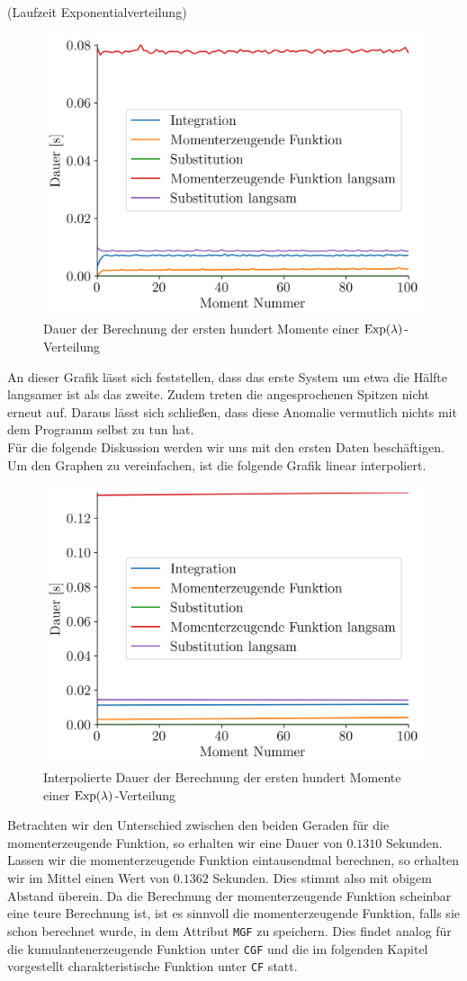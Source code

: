 \begin{Beispiel}{(Laufzeit Exponentialverteilung)}
\begin{figure}[H]
\centering
\includegraphics[width=0.5\linewidth]{./Section/Momente/Dauer Exp Alex.png}
\vspace*{-.3\baselineskip}
\caption{Dauer der Berechnung der ersten hundert Momente einer $\operatorname{Exp}(\lambda)$-Verteilung}
\end{figure}

An dieser Grafik lässt sich feststellen, dass das erste System um etwa die Hälfte langsamer ist als das zweite. Zudem treten die angesprochenen Spitzen nicht erneut auf. Daraus lässt sich schließen, dass diese Anomalie vermutlich nichts mit dem Programm selbst zu tun hat.\\

Für die folgende Diskussion werden wir uns mit den ersten Daten beschäftigen. Um den Graphen zu vereinfachen, ist die folgende Grafik linear interpoliert.

\begin{figure}[H]
\centering
\includegraphics[width=0.5\linewidth]{./Section/Momente/Dauer Exp Lin.png}
\vspace*{-.3\baselineskip}
\caption{Interpolierte Dauer der Berechnung der ersten hundert Momente einer $\operatorname{Exp}(\lambda)$-Verteilung}
\end{figure}

Betrachten wir den Unterschied zwischen den beiden Geraden für die momenterzeugende Funktion, so erhalten wir eine Dauer von $0.1310$ Sekunden. Lassen wir die momenterzeugende Funktion eintausendmal berechnen, so erhalten wir im Mittel einen Wert von $0.1362$ Sekunden. Dies stimmt also mit obigem Abstand überein. Da die Berechnung der momenterzeugende Funktion scheinbar eine \glqq teure\grqq{} Berechnung ist, ist es sinnvoll die momenterzeugende Funktion, falls sie schon berechnet wurde, in dem Attribut \lstinline|MGF| zu speichern. Dies findet analog für die kumulantenerzeugende Funktion unter \lstinline|CGF| und die im folgenden Kapitel vorgestellt charakteristische Funktion unter \lstinline|CF| statt.\\


\end{Beispiel}
